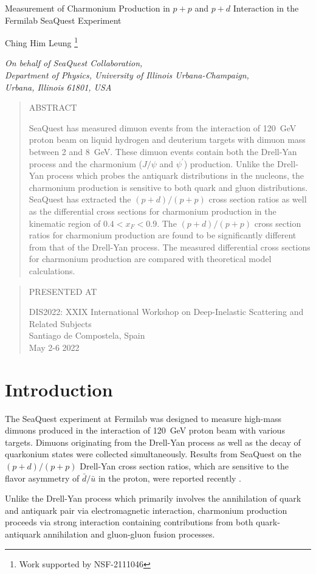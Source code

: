 \documentclass[10pt, a4paper,final]{article}
\def\Title#1{\begin{center} {\Large #1 } \end{center}}
\def\Author#1{\begin{center}{ \sc #1} \end{center}}
\def\Address#1{\begin{center}{ \it #1} \end{center}}
\newcommand\pubblock{\rightline{\begin{tabular}{l} Proceedings of DIS2022\\ 
         \pubdate  \end{tabular}}}
\newenvironment{Abstract}{\begin{quotation} \begin{center} 
             \large ABSTRACT \end{center}\bigskip 
      \begin{large}}{\end{large}\end{quotation}}
\newenvironment{Presented}{\begin{quotation} \begin{center} 
             PRESENTED AT\end{center}\bigskip 
      \begin{center}\begin{large}}{\end{large}\end{center} \end{quotation}}
\newcommand\pubdate{\today}
\def\affiliation{
On behalf of SeaQuest Collaboration, \\
Department of Physics, University of Illinois Urbana-Champaign, \\Urbana, Illinois 61801, USA}
\def\support{\footnote{Work supported by NSF-2111046}}
\newcommand{\conference}{DIS2022: XXIX International Workshop on Deep-Inelastic Scattering and Related Subjects\\
Santiago de Compostela, Spain\\
May 2-6 2022}
\begin{document}
\large
\begin{titlepage}
	\pubblock


	\vfill
	\Title{Measurement of Charmonium Production in $p + p$ and $p + d$ Interaction in the Fermilab SeaQuest Experiment}
	\vfill

	\Author{Ching Him Leung \support}
	\Address{\affiliation}
	\vfill

	\begin{Abstract}
		SeaQuest has measured dimuon events from the interaction of \SI{120}{\GeV} proton
		beam on liquid hydrogen and deuterium targets with dimuon mass between \num{2}
		and \SI{8}{\GeV}. These dimuon events contain both the Drell-Yan process and the
		charmonium ($J/\psi$ and $\psi^\prime$) production. Unlike the Drell-Yan process
		which probes the antiquark distributions in the nucleons, the charmonium production
		is sensitive to both quark and gluon distributions. SeaQuest has extracted the
		$(p+d)/(p+p)$ cross section ratios as well as the differential cross sections for
		charmonium production in the kinematic region of $0.4 < x_F < 0.9$. The $(p+d)/(p+p)$
		cross section ratios for charmonium production are found to be significantly different
		from that of the Drell-Yan process. The measured differential cross sections for
		charmonium production are compared with theoretical model calculations.
	\end{Abstract}

	\vfill

	\begin{Presented}
		\conference
	\end{Presented}
	\vfill
\end{titlepage}

\setcounter{footnote}{0}
\normalsize


\section{Introduction}
\label{sec:intro}
The SeaQuest experiment at Fermilab was designed to measure high-mass dimuons
produced in the interaction of \SI{120}{\GeV} proton beam with various targets.
Dimuons originating from the Drell-Yan process \cite{drell1970} as well as the
decay of quarkonium states were collected simultaneously. Results from SeaQuest
on the $(p+d)/(p+p)$ Drell-Yan cross section ratios, which are sensitive to
the flavor asymmetry of $\bar{d}/\bar{u}$ in the proton, were reported recently
\cite{dove2021}.

Unlike the Drell-Yan process which primarily involves the annihilation of quark
and antiquark pair via electromagnetic interaction, charmonium production proceeds
via strong interaction containing contributions from both quark-antiquark
annihilation and gluon-gluon fusion processes.
\end{document}
